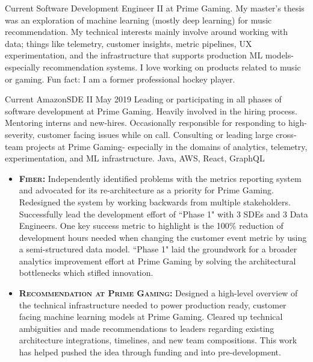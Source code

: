 \documentclass{cv}
\begin{document}
	\makecvheader

	\par{
		Current Software Development Engineer II at Prime Gaming. My master's thesis was an exploration of machine learning (mostly deep learning) for music recommendation. My technical interests mainly involve around working with data; things like telemetry, customer insights, metric pipelines, UX experimentation, and the infrastructure that supports production ML models- especially recommendation systems. I love working on products related to music or gaming. Fun fact: I am a former professional hockey player.
	}

	\bigskip
	
	\begin{experiences_env}
		\experienceWithProjects
			{Current}       {Amazon}{SDE II}
			{May 2019}      {
								Leading or participating in all phases of software development at Prime Gaming. Heavily involved in the hiring process. Mentoring interns and new-hires. Occasionally responsible for responding to high-severity, customer facing issues while on call. Consulting or leading large cross-team projects at Prime Gaming- especially in the domains of analytics, telemetry, experimentation, and ML infrastructure.
							}
							{Java, AWS, React, GraphQL}
							{
								\begin{itemize}
									\item \textbf{\textsc{Fiber:}} Independently identified problems with the metrics reporting system and advocated for its re-architecture as a priority for Prime Gaming. Redesigned the system by working backwards from multiple stakeholders. Successfully lead the development effort of ``Phase 1" with 3 SDEs and 3 Data Engineers. One key success metric to highlight is the 100\% reduction of development hours needed when changing the customer event metric by using a semi-structured data model. ``Phase 1" laid the groundwork for a broader analytics improvement effort at Prime Gaming by solving the architectural bottlenecks which stifled innovation.
									\item \textbf{\textsc{Recommendation at Prime Gaming:}} Designed a high-level overview of the technical infrastructure needed to power production ready, customer facing machine learning models at Prime Gaming. Cleared up technical ambiguities and made recommendations to leaders regarding existing architecture integrations, timelines, and new team compositions. This work has helped pushed the idea through funding and into pre-development.

\end{itemize}}
\end{experiences_env}
\end{document}
